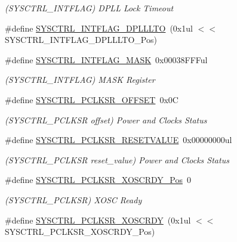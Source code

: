 \begin{DoxyCompactItemize}
\begin{DoxyCompactList}\small\item\em (S\+Y\+S\+C\+T\+R\+L\+\_\+\+I\+N\+T\+F\+L\+AG) D\+P\+LL Lock Timeout \end{DoxyCompactList}\item 
\#define \mbox{\hyperlink{group___s_a_m_d21___s_y_s_c_t_r_l_ga6359895c7e01066949e00d6d709f9ec8}{S\+Y\+S\+C\+T\+R\+L\+\_\+\+I\+N\+T\+F\+L\+A\+G\+\_\+\+D\+P\+L\+L\+L\+TO}}~(0x1ul $<$$<$ S\+Y\+S\+C\+T\+R\+L\+\_\+\+I\+N\+T\+F\+L\+A\+G\+\_\+\+D\+P\+L\+L\+L\+T\+O\+\_\+\+Pos)
\item 
\#define \mbox{\hyperlink{group___s_a_m_d21___s_y_s_c_t_r_l_gaab3e4d70032cbc7800739f89e90ee7aa}{S\+Y\+S\+C\+T\+R\+L\+\_\+\+I\+N\+T\+F\+L\+A\+G\+\_\+\+M\+A\+SK}}~0x00038\+F\+F\+Ful
\begin{DoxyCompactList}\small\item\em (S\+Y\+S\+C\+T\+R\+L\+\_\+\+I\+N\+T\+F\+L\+AG) M\+A\+SK Register \end{DoxyCompactList}\item 
\#define \mbox{\hyperlink{group___s_a_m_d21___s_y_s_c_t_r_l_gae21acbfaa0c753306cc20800665cfa7e}{S\+Y\+S\+C\+T\+R\+L\+\_\+\+P\+C\+L\+K\+S\+R\+\_\+\+O\+F\+F\+S\+ET}}~0x0C
\begin{DoxyCompactList}\small\item\em (S\+Y\+S\+C\+T\+R\+L\+\_\+\+P\+C\+L\+K\+SR offset) Power and Clocks Status \end{DoxyCompactList}\item 
\#define \mbox{\hyperlink{group___s_a_m_d21___s_y_s_c_t_r_l_ga81362b4579b0d0821cd17d2184f42ea6}{S\+Y\+S\+C\+T\+R\+L\+\_\+\+P\+C\+L\+K\+S\+R\+\_\+\+R\+E\+S\+E\+T\+V\+A\+L\+UE}}~0x00000000ul
\begin{DoxyCompactList}\small\item\em (S\+Y\+S\+C\+T\+R\+L\+\_\+\+P\+C\+L\+K\+SR reset\+\_\+value) Power and Clocks Status \end{DoxyCompactList}\item 
\#define \mbox{\hyperlink{group___s_a_m_d21___s_y_s_c_t_r_l_ga9e84e80de7307333d0d5f9071e9d434a}{S\+Y\+S\+C\+T\+R\+L\+\_\+\+P\+C\+L\+K\+S\+R\+\_\+\+X\+O\+S\+C\+R\+D\+Y\+\_\+\+Pos}}~0
\begin{DoxyCompactList}\small\item\em (S\+Y\+S\+C\+T\+R\+L\+\_\+\+P\+C\+L\+K\+SR) X\+O\+SC Ready \end{DoxyCompactList}\item 
\#define \mbox{\hyperlink{group___s_a_m_d21___s_y_s_c_t_r_l_gac5b5a3927c0ece1491c8f05446892356}{S\+Y\+S\+C\+T\+R\+L\+\_\+\+P\+C\+L\+K\+S\+R\+\_\+\+X\+O\+S\+C\+R\+DY}}~(0x1ul $<$$<$ S\+Y\+S\+C\+T\+R\+L\+\_\+\+P\+C\+L\+K\+S\+R\+\_\+\+X\+O\+S\+C\+R\+D\+Y\+\_\+\+Pos)

\end{DoxyCompactItemize}
